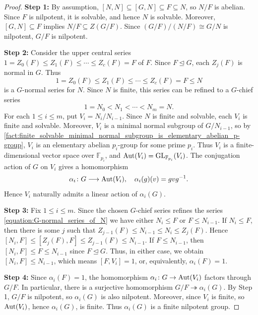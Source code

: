 \begin{proof}
    \textbf{Step 1:}
    By assumption, $[N,N] \subseteq [G,N] \subseteq F \subseteq N$, so $N/F$ is abelian. Since $F$ is nilpotent, it is solvable, and hence $N$ is solvable. Moreover, $[G,N] \subseteq F$ implies $N/F \subseteq Z(G/F)$. Since $(G/F)/(N/F)\cong G/N$ is nilpotent, $G/F$ is nilpotent.

    \textbf{Step 2:}
    Consider the upper central series $1=Z_0(F)\leq Z_1(F)\leq\cdots\leq Z_c(F)=F$ of $F$. Since $F\trianglelefteq G$, each $Z_j(F)$ is normal in $G$. Thus
    \begin{equation}
        1=Z_0(F) \leq Z_1(F) \leq \cdots \leq Z_c(F)=F \leq N \label{equation:G-normal_series_of_N}
    \end{equation}
    is a $G$-normal series for $N$. Since $N$ is finite, this series can be refined to a $G$-chief series
    \[ 1=N_0 < N_1 < \cdots < N_m=N. \]
    For each \(1\le i\le m\), put $V_i=N_i/N_{i-1}$. Since $N$ is finite and solvable, each $V_i$ is finite and solvable. Moreover, $V_i$ is a minimal normal subgroup of $G/N_{i-1}$, so by \cref{fact:finite_solvable_minimal_normal_subgroup_is_elementary_abelian_p-group}, $V_i$ is an elementary abelian $p_i$-group for some prime $p_i$. Thus $V_i$ is a finite-dimensional vector space over $\mathbb{F}_{p_i}$, and $\operatorname{Aut}(V_i)=\operatorname{GL}_{\mathbb{F}_{p_i}}(V_i)$. 
    The conjugation action of $G$ on $V_i$ gives a homomorphism
    \[ \alpha_i\colon G\longrightarrow \operatorname{Aut}(V_i), \quad \alpha_i(g)(v)= gvg^{-1}. \]
    Hence $V_i$ naturally admits a linear action of $\alpha_i(G)$.

    \textbf{Step 3:}
    Fix $1\leq i \leq m$. Since the chosen $G$-chief series refines the series \eqref{equation:G-normal_series_of_N} we have either $N_i \leq F$ or $F\leq N_{i-1}$.
    If $N_i \leq F$, then there is some $j$ such that $Z_{j-1}(F) \leq N_{i-1} \leq N_i \leq Z_j(F)$. Hence $[N_i, F] \leq [Z_j(F), F] \leq Z_{j-1}(F) \leq N_{i-1}$.
    If $F\leq N_{i-1}$, then $[N_i, F] \leq F \leq N_{i-1}$ since $F \trianglelefteq G$.
    Thus, in either case, we obtain $[N_i,F] \leq N_{i-1}$, which means $[F,V_i]=1$, or, equivalently, $\alpha_i(F)=1$.

    \textbf{Step 4:}
    Since $\alpha_i(F)=1$, the homomorphism $\alpha_i\colon G \to \operatorname{Aut}(V_i)$ factors through $G/F$. In particular, there is a surjective homomorphism $G/F \twoheadrightarrow \alpha_i(G)$.
    By Step 1, $G/F$ is nilpotent, so $\alpha_i(G)$ is also nilpotent. Moreover, since $V_i$ is finite, so $\operatorname{Aut}(V_i)$, hence $\alpha_i(G)$, is finite. Thus $\alpha_i(G)$ is a finite nilpotent group.


\end{proof}
